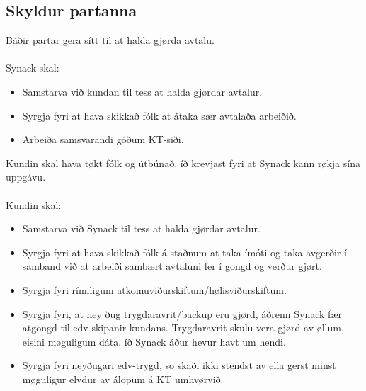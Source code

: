 \subsection{Skyldur partanna}
Báðir partar gera sítt til at halda gjørda avtalu. \\ \\
Synack skal:
\begin{itemize}
	\item Samstarva við kundan til tess at halda gjørdar avtalur.
	\item Syrgja fyri at hava skikkað fólk at átaka sær avtalaða arbeiðið.
	\item Arbeiða samsvarandi góðum KT-siði.
\end{itemize} \vspace{5mm}
Kundin skal hava tøkt fólk og útbúnað, íð krevjast fyri at Synack kann røkja sína uppgávu. \\ \\
Kundin skal:
\begin{itemize}
	\item Samstarva við Synack til tess at halda gjørdar avtalur.
	\item Syrgja fyri at hava skikkað fólk á staðnum at taka ímóti og taka avgerðir í samband við at arbeiði	sambært avtaluni fer í gongd og verður gjørt.
	\item Syrgja fyri rímiligum atkomuviðurskiftum/hølisviðurskiftum.
	\item Syrgja fyri, at ney ðug trygdaravrit/backup eru gjørd, áðrenn Synack fær atgongd til edv-skipanir kundans. Trygdaravrit skulu vera gjørd av øllum, eisini møguligum dáta, íð Synack áður hevur havt um hendi.
	\item Syrgja fyri neyðugari edv-trygd, so skaði ikki stendst av ella gerst minst møguligur elvdur av álopum á KT umhvørvið.
\end{itemize}

